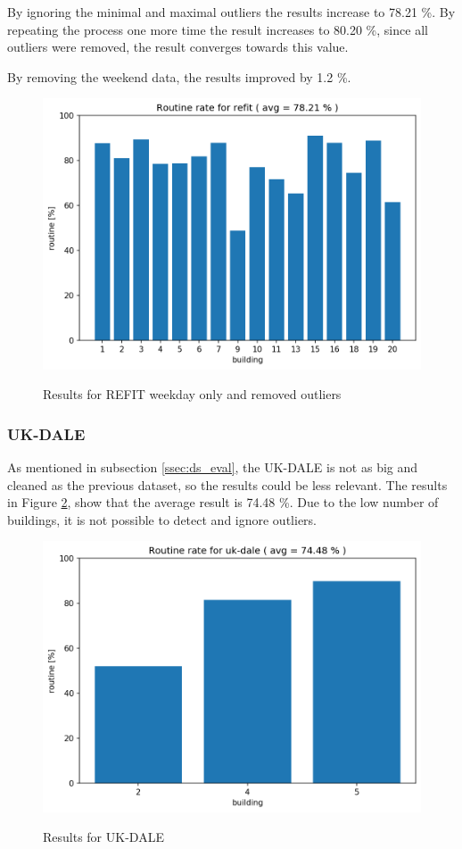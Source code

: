 By ignoring the minimal and maximal outliers the results increase to 78.21 \%.
By repeating the process one more time the result increases to 80.20 \%, since all outliers were removed, the result converges towards this value. 

By removing the weekend data, the results improved by 1.2 \%. 

\begin{figure}[H]
	\centering
	\caption{Results for REFIT weekday only and removed outliers}
	\includegraphics[width=.8\textwidth]{Figures/EC/refit_res_nw_2.png}
	\label{fig:refit_res_nw_2"}
\end{figure}

\subsubsection{UK-DALE}

As mentioned in subsection \ref{ssec:ds_eval}, the UK-DALE is not as big and cleaned as the previous dataset, so the results could be less relevant.
The results in Figure \ref{fig:ukdale_res}, show that the average result is 74.48 \%. 
Due to the low number of buildings, it is not possible to detect and ignore outliers.

\begin{figure}[H]
	\centering
	\caption{Results for UK-DALE}
	\includegraphics[width=.7\textwidth]{Figures/EC/ukdale_res.png}
	\label{fig:ukdale_res}
\end{figure}

